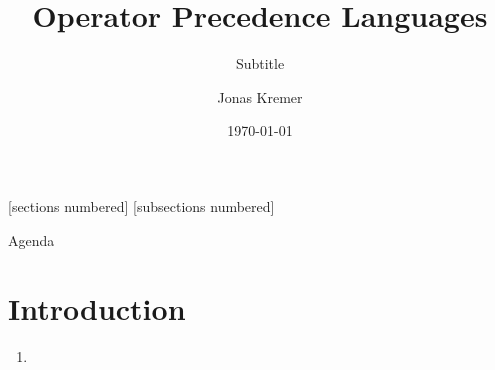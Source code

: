 \documentclass[
10pt,
pantone315, 	%
]{beamer}
\begin{document}
\date{\today}
\author{Jonas Kremer}
\title{Operator Precedence Languages}
\subtitle{Subtitle}

[sections numbered]
[subsections numbered]


\begin{frame}[plain]
  \maketitle
\end{frame}

\begin{frame}[t]{Agenda}
\end{frame}

\section{Introduction}
\begin{frame}[t]{\secname}
	\begin{enumerate}[<+->]
		\item
	\end{enumerate}	
\end{frame}
\end{document}
